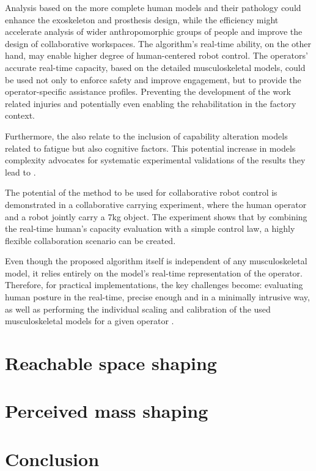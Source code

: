 Analysis based on the more complete human models and their pathology could enhance the exoskeleton and prosthesis design, while the efficiency might accelerate analysis of wider anthropomorphic groups of people and improve the design of collaborative workspaces. The algorithm's real-time ability, on the other hand, may enable higher degree of human-centered robot control. The operators' accurate real-time capacity, based on the detailed musculoskeletal models, could be used not only to enforce safety and improve engagement, but to provide the operator-specific assistance profiles. Preventing the development of the work related injuries and potentially even enabling the rehabilitation in the factory context.

Furthermore, the  also relate to the inclusion of capability alteration models related to fatigue but also cognitive factors. This potential increase in models complexity advocates for systematic experimental validations of the results they lead to \cite{biomechanics1010008}.

The potential of the method to be used for collaborative robot control is demonstrated in a collaborative carrying experiment, where the human operator and a robot jointly carry a 7kg object. The experiment shows that by combining the real-time human's capacity evaluation with a simple control law, a highly flexible collaboration scenario can be created. 

Even though the proposed algorithm itself is independent of any musculoskeletal model, it relies entirely on the model's real-time representation of the operator. Therefore, for practical implementations, the key challenges become: evaluating human posture in the real-time, precise enough and in a minimally intrusive way, as well as performing the individual scaling and calibration of the used musculoskeletal models for a given operator \cite{correa20112782}.

\section{Reachable space shaping}
\label{ch:human_robot_reachable_space}


\section{Perceived mass shaping}
\label{ch:human_robot_percieved_mass}


\section{Conclusion}


